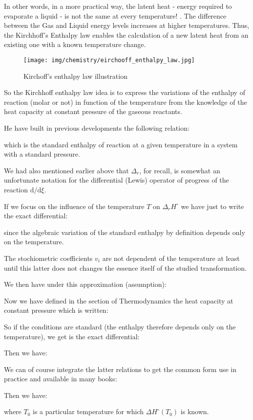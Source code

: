	In other words, in a more practical way, the latent heat - energy required to evaporate a liquid - is not the same at every temperature! . The difference between the Gas and Liquid energy levels increases at higher temperatures. Thus, the Kirchhoff's Enthalpy law enables the calculation of a new latent heat from an existing one with a known temperature change.
	\begin{figure}[H]
		\centering
		\texttt{[image: img/chemistry/eirchooff\_enthalpy\_law.jpg]}	
		\caption{Kirchoff's enthalpy law illustration}
	\end{figure}
	So the Kirchhoff enthalpy law idea is to express the variations of the enthalpy of reaction (molar or not) in function of the temperature from the knowledge of the heat capacity at constant pressure of the gaseous reactants.

	He have built in previous developments the following relation:
	
	which is the standard enthalpy of reaction at a given temperature in a system with a standard pressure.

	We had also mentioned earlier above that $\Delta_r$, for recall, is somewhat an unfortunate notation for the differential (Lewis) operator of progress of the reaction $\mathrm{d}/\mathrm{d}\xi$.
	
	If we focus on the influence of the temperature $T$ on $\Delta_r H^\circ$ we have just to write the exact differential:
	
	since the algebraic variation of the standard enthalpy by definition depends only on the temperature.

	The stochiometric coefficients $v_i$ are not dependent of the temperature at least until this latter does not changes the essence itself of the studied transformation.
	
	We then have under this approximation (assumption):
	
	Now we have defined in the section of Thermodynamics the heat capacity at constant pressure which is written:
	
	So if the conditions are standard (the enthalpy therefore depends only on the temperature), we get is the exact differential:
	
	Then we have:
	
	We can of course integrate the latter relations to get the common form use in practice and available in many books:
	
	Then we have:
	
	where $T_0$ is a particular temperature for which $\Delta H^\circ (T_0)$ is known.

